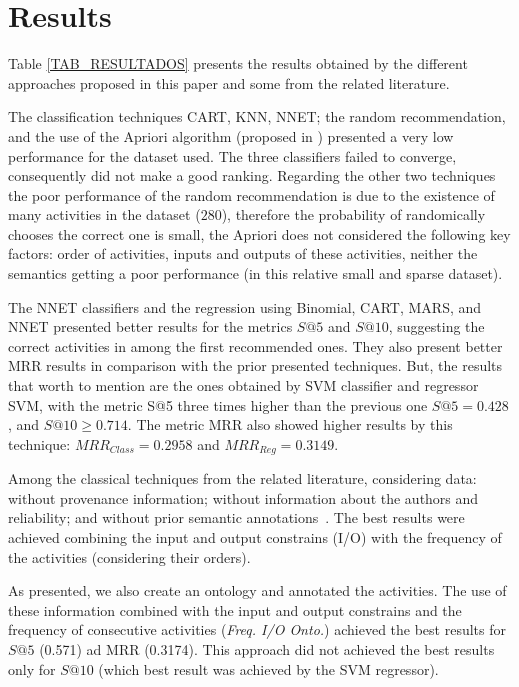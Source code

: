 \documentclass{sig-alternate-05-2015}
\begin{document}
\section{Results}\label{EXPERIMENTOS}
Table \ref{TAB_RESULTADOS} presents the results obtained by the different approaches proposed in this paper and some from the related literature.

The classification techniques CART, KNN, NNET; the random recommendation, and the use of the Apriori algorithm (proposed in \cite{Tan2011, Wang2009}) presented a very low performance for the dataset used. The three classifiers failed to converge, consequently did not make a good ranking. Regarding the other two techniques the poor performance of the random recommendation is due to the existence of many activities in the dataset (\(280\)), therefore the probability of randomically chooses the correct one is small, the Apriori does not considered the following key factors: order of activities, inputs and outputs of these activities, neither the semantics getting a poor performance (in this relative small and sparse dataset).

The NNET classifiers and the regression using Binomial, CART, MARS, and NNET presented better results for the metrics \(S@5\) and \(S@10\), suggesting the correct activities in among the first recommended ones. They also present better MRR results in comparison with the prior presented techniques. But, the results that worth to mention are the ones obtained by SVM classifier and regressor SVM, with the metric S@5 three times higher than the previous one \(S@5 = 0.428\), and \(S@10 \geq 0.714\). The metric MRR also showed higher results by this technique: \(MRR_{Class} = 0.2958\) and \(MRR_{Reg} = 0.3149\).

Among the classical techniques from the related literature, considering data: without provenance information; without information about the authors and reliability; and without prior semantic annotations~\cite{TELEA13, VINCA4Science07, Grafo12, diamantini_mining_2012, Zhang2011, Zhang2014}. The best results were achieved combining the input and output constrains (I/O) with the frequency of the activities (considering their orders).

As presented, we also create an ontology and annotated the activities. The use of these information combined with the input and output constrains and the frequency of consecutive activities (\emph{Freq. I/O Onto.}) achieved the best results for \(S@5\) (0.571) ad MRR (0.3174). This approach did not achieved the best results only for \(S@10\) (which best result was achieved by the SVM regressor).
\end{document}
